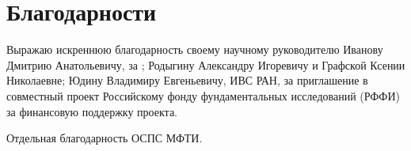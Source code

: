 \section{Благодарности}
Выражаю искреннюю благодарность своему научному руководителю Иванову Дмитрию Анатольевичу, за ; Родыгину Александру Игоревичу и Графской Ксении Николаевне;
Юдину Владимиру Евгеньевичу, ИВС РАН, за приглашение в совместный проект
Российскому фонду фундаментальных исследований (РФФИ) за финансовую поддержку проекта.

Отдельная благодарность ОСПС МФТИ. 
